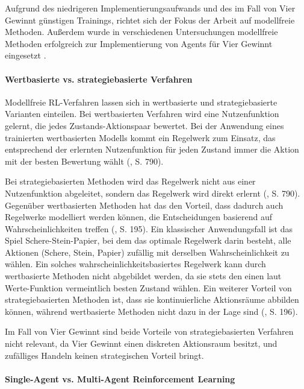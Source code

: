 Aufgrund des niedrigeren Implementierungsaufwands und des im Fall von Vier Gewinnt günstigen Trainings, richtet sich der Fokus der Arbeit auf modellfreie Methoden. Außerdem wurde in verschiedenen Untersuchungen modellfreie Methoden erfolgreich zur Implementierung von Agents für Vier Gewinnt eingesetzt \cite{Taylor.2024} \cite{Dabas.2022} \cite{Wäldchen.2022}.

\paragraph{Wertbasierte vs. strategiebasierte Verfahren}

Modellfreie RL-Verfahren lassen sich in wertbasierte und strategiebasierte Varianten einteilen. Bei wertbasierten Verfahren wird eine Nutzenfunktion gelernt, die jedes Zustands-Aktionspaar bewertet. Bei der Anwendung eines trainierten wertbasierten Modells kommt ein Regelwerk zum Einsatz, das entsprechend der erlernten Nutzenfunktion für jeden Zustand immer die Aktion mit der besten Bewertung wählt (\cite{Russell.2020}, S. 790).

Bei strategiebasierten Methoden wird das Regelwerk nicht aus einer Nutzenfunktion abgeleitet, sondern das Regelwerk wird direkt erlernt (\cite{Russell.2020}, S. 790). Gegenüber wertbasierten Methoden hat das den Vorteil, dass dadurch auch Regelwerke modelliert werden können, die Entscheidungen basierend auf Wahrscheinlichkeiten treffen (\cite{Albrecht.2024}, S. 195). Ein klassischer Anwendungsfall ist das Spiel Schere-Stein-Papier, bei dem das optimale Regelwerk darin besteht, alle Aktionen (Schere, Stein, Papier) zufällig mit derselben Wahrscheinlichkeit zu wählen. Ein solches wahrscheinlichkeitsbasiertes Regelwerk kann durch wertbasierte Methoden nicht abgebildet werden, da sie stets den einen laut Werte-Funktion vermeintlich besten Zustand wählen. Ein weiterer Vorteil von strategiebasierten Methoden ist, dass sie kontinuierliche Aktionsräume abbilden können, während wertbasierte Methoden nicht dazu in der Lage sind (\cite{Albrecht.2024}, S. 196).

Im Fall von Vier Gewinnt sind beide Vorteile von strategiebasierten Verfahren nicht relevant, da Vier Gewinnt einen diskreten Aktionsraum besitzt, und zufälliges Handeln keinen strategischen Vorteil bringt.

\paragraph{Single-Agent vs. Multi-Agent Reinforcement Learning}

